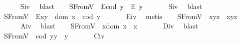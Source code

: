 \begin{isabellebody}
%
\isadelimproof
\ \ \ \ %
\endisadelimproof
%
\isatagproof
{}\isamarkupfalse%
\ S\isactrlsub i\isactrlsub v\ \isamarkupfalse%
\ blast%
\endisatagproof
{\isafoldproof}%
%
\isadelimproof
\isanewline
%
\endisadelimproof
\ \ \isamarkupfalse%
\ S{}FromV{\isacharcolon}\ \ {\isachardoublequoteopen}E{\isacharparenleft}cod\ y{\isacharparenright}\ \isactrlbold {\isasymrightarrow}\ E\ y{\isachardoublequoteclose}\ \isanewline
%
\isadelimproof
\ \ \ \ %
\endisadelimproof
%
\isatagproof
{}\isamarkupfalse%
\ S\isactrlsub i\isactrlsub v\ \isamarkupfalse%
\ blast%
\endisatagproof
{\isafoldproof}%
%
\isadelimproof
\isanewline
%
\endisadelimproof
\ \ \isamarkupfalse%
\ S{}FromV{\isacharcolon}\ \ {\isachardoublequoteopen}E{\isacharparenleft}x{\isasymcdot}y{\isacharparenright}\ \isactrlbold {\isasymleftrightarrow}\ dom\ x\ {\isasymsimeq}\ cod\ y{\isachardoublequoteclose}\ \isanewline
%
\isadelimproof
\ \ \ \ %
\endisadelimproof
%
\isatagproof
{}\isamarkupfalse%
\ E\isactrlsub i\isactrlsub v\ \isamarkupfalse%
\ metis%
\endisatagproof
{\isafoldproof}%
%
\isadelimproof
\isanewline
%
\endisadelimproof
\ \ \isamarkupfalse%
\ S{}FromV{\isacharcolon}\ \ {\isachardoublequoteopen}x{\isasymcdot}{\isacharparenleft}y{\isasymcdot}z{\isacharparenright}\ {\isasymcong}\ {\isacharparenleft}x{\isasymcdot}y{\isacharparenright}{\isasymcdot}z{\isachardoublequoteclose}\ \isanewline
%
\isadelimproof
\ \ \ \ %
\endisadelimproof
%
\isatagproof
{}\isamarkupfalse%
\ A\isactrlsub i\isactrlsub v\ \isamarkupfalse%
\ blast%
\endisatagproof
{\isafoldproof}%
%
\isadelimproof
\isanewline
%
\endisadelimproof
\ \ \isamarkupfalse%
\ S{}FromV{\isacharcolon}\ \ {\isachardoublequoteopen}x{\isasymcdot}{\isacharparenleft}dom\ x{\isacharparenright}\ {\isasymcong}\ x{\isachardoublequoteclose}\ \isanewline
%
\isadelimproof
\ \ \ \ %
\endisadelimproof
%
\isatagproof
{}\isamarkupfalse%
\ D\isactrlsub i\isactrlsub v\ \isamarkupfalse%
\ blast%
\endisatagproof
{\isafoldproof}%
%
\isadelimproof
\isanewline
%
\endisadelimproof
\ \ \isamarkupfalse%
\ S{}FromV{\isacharcolon}\ \ {\isachardoublequoteopen}{\isacharparenleft}cod\ y{\isacharparenright}{\isasymcdot}y\ {\isasymcong}\ y{\isachardoublequoteclose}\ \isanewline
%
\isadelimproof
\ \ \ \ %
\endisadelimproof
%
\isatagproof
{}\isamarkupfalse%
\ C\isactrlsub i\isactrlsub v\ \isamarkupfalse%

\end{isabellebody}
